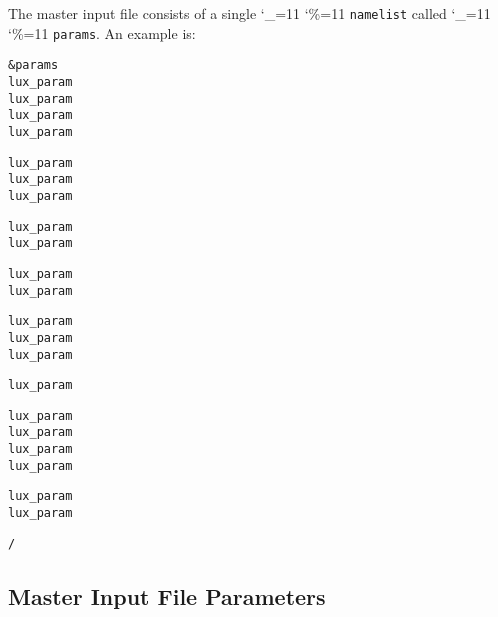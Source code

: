 \documentclass[11pt]{article}
\newcommand\ttcmd{\begingroup\catcode`\_=11 \catcode`\%=11 \dottcmd}
\newcommand\dottcmd[1]{\texttt{#1}\endgroup}
\newcommand{\vn}{\ttcmd}
\newenvironment{example}
  {\vspace{\ExBeg} \begin{alltt}}
  {\end{alltt} \vspace{\ExEnd}}
\newlength{\ExBeg}
\newlength{\ExEnd}
\begin{document}
The master input file consists of a single \vn{namelist} called \vn{params}.
An example is:
\begin{example}
  &params
    lux_param%
    lux_param%
    lux_param%
    lux_param%

    lux_param%
    lux_param%
    lux_param%

    lux_param%
    lux_param%

    lux_param%
    lux_param%

    lux_param%
    lux_param%
    lux_param%

    lux_param%

    lux_param%
    lux_param%
    lux_param%
    lux_param%

    lux_param%
    lux_param%

  /
\end{example}

\subsection{Master Input File Parameters}
\label{ss:master.params}
\end{document}
